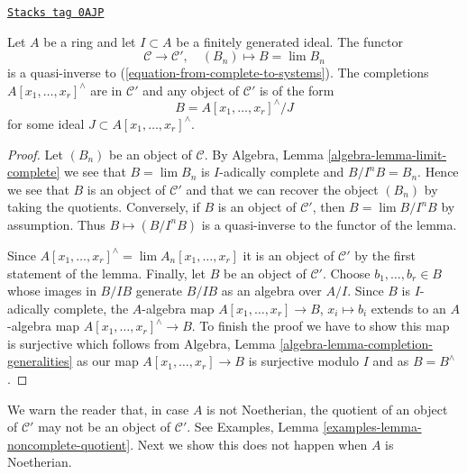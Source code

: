 \begin{lemma}
\label{restricted-lemma-topologically-finite-type}
\href{https://stacks.math.columbia.edu/tag/0AJP}{\texttt{Stacks tag 0AJP}}

Let $A$ be a ring and let $I \subset A$ be a finitely generated ideal.
The functor
$$
\mathcal{C} \longrightarrow \mathcal{C}',\quad
(B_n) \longmapsto B = \lim B_n
$$
is a quasi-inverse to (\ref{equation-from-complete-to-systems}).
The completions $A[x_1, \ldots, x_r]^\wedge$ are in $\mathcal{C}'$ and
any object of $\mathcal{C}'$ is of the form
$$
B = A[x_1, \ldots, x_r]^\wedge / J
$$
for some ideal $J \subset A[x_1, \ldots, x_r]^\wedge$.
\end{lemma}

\begin{proof}
Let $(B_n)$ be an object of $\mathcal{C}$. By
Algebra, Lemma \ref{algebra-lemma-limit-complete}
we see that $B = \lim B_n$ is $I$-adically complete
and $B/I^nB = B_n$. Hence we see that $B$ is an object of
$\mathcal{C}'$ and that we can recover the object $(B_n)$
by taking the quotients.
Conversely, if $B$ is an object of $\mathcal{C}'$, then
$B = \lim B/I^nB$ by assumption. Thus $B \mapsto (B/I^nB)$ is a quasi-inverse
to the functor of the lemma.

\medskip\noindent
Since $A[x_1, \ldots, x_r]^\wedge = \lim A_n[x_1, \ldots, x_r]$
it is an object of $\mathcal{C}'$ by the first statement of the lemma.
Finally, let $B$ be an object of $\mathcal{C}'$. Choose
$b_1, \ldots, b_r \in B$ whose images in $B/IB$ generate
$B/IB$ as an algebra over $A/I$. Since $B$ is $I$-adically
complete, the $A$-algebra map $A[x_1, \ldots, x_r] \to B$, $x_i \mapsto b_i$
extends to an $A$-algebra map $A[x_1, \ldots, x_r]^\wedge \to B$.
To finish the proof we have to show this map is surjective
which follows from Algebra, Lemma \ref{algebra-lemma-completion-generalities}
as our map $A[x_1, \ldots, x_r] \to B$ is surjective modulo $I$
and as $B = B^\wedge$.
\end{proof}

We warn the reader that, in case $A$ is not Noetherian, the
quotient of an object of $\mathcal{C}'$ may not be an object
of $\mathcal{C}'$. See Examples, Lemma
\ref{examples-lemma-noncomplete-quotient}.
Next we show this does not happen when $A$ is Noetherian.

